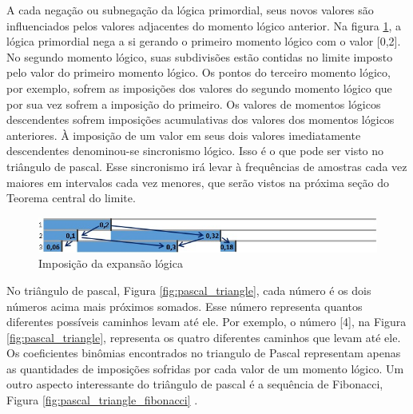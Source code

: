 A cada negação ou subnegação da lógica primordial, seus novos valores são influenciados pelos valores adjacentes do momento lógico anterior. Na figura \ref{fig:imposition_of_binomial_expansion}, a lógica primordial nega a si gerando o primeiro momento lógico com o valor [0,2].  No segundo momento lógico, suas subdivisões estão contidas no limite imposto pelo valor do primeiro momento lógico. Os pontos do terceiro momento lógico, por exemplo, sofrem as imposições dos valores do segundo momento lógico que por sua vez sofrem a imposição do primeiro. Os valores de momentos lógicos descendentes sofrem imposições acumulativas dos valores dos momentos lógicos anteriores. À imposição de um valor em seus dois valores imediatamente descendentes denominou-se sincronismo lógico. Isso é o que pode ser visto no triângulo de pascal. Esse sincronismo irá levar à frequências de amostras cada vez maiores em intervalos cada vez menores, que serão vistos na próxima seção do Teorema central do limite.

\begin{figure}[H]
\caption{Imposição da expansão lógica}
\label{fig:imposition_of_binomial_expansion}
\centering
\includegraphics[scale=.85]{sections/images/imposition_of_binomial_expansion.jpg}
\end{figure}

No triângulo de pascal, Figura \ref{fig:pascal_triangle}, cada número é os dois números acima mais próximos somados. Esse número representa quantos diferentes possíveis caminhos levam até ele. Por exemplo, o número [4], na Figura \ref{fig:pascal_triangle}, representa os quatro diferentes caminhos que levam até ele. Os coeficientes binômias encontrados no triangulo de Pascal representam apenas as quantidades de imposições sofridas por cada valor de um momento lógico. Um outro aspecto interessante do triângulo de pascal é a sequência de Fibonacci, Figura \ref{fig:pascal_triangle_fibonacci} \cite{mathisfun_pascal_triangle}.  

